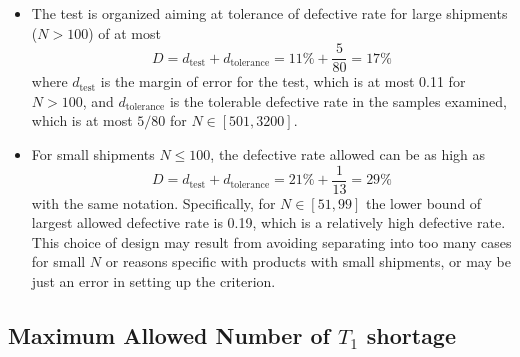 \documentclass{article}
\begin{document}
\begin{itemize}
    \item The test is organized aiming at tolerance of defective rate for large shipments ($N > 100$) of at most 
    $$
    D = d_{\text{test}} + d_{\text{tolerance}} = 11\% + \frac{5}{80} = 17\%
    $$
    where $d_{\text{test}}$ is the margin of error for the test, which is at most 0.11 for $N > 100$, and $d_{\text{tolerance}}$ is the tolerable defective rate in the samples examined, which is at most $5/80$ for $N\in[501, 3200]$. 
    \item For small shipments $N \leq 100$, the defective rate allowed can be as high as
    $$
    D = d_{\text{test}} + d_{\text{tolerance}} = 21\% + \frac{1}{13} = 29\%
    $$
    with the same notation. Specifically, for $N\in[51, 99]$ the lower bound of largest allowed defective rate is 0.19, which is a relatively high defective rate. This choice of design may result from avoiding separating into too many cases for small $N$ or reasons specific with products with small shipments, or may be just an error in setting up the criterion.
\end{itemize}

\subsection{Maximum Allowed Number of $T_1$ shortage}
\end{document}
